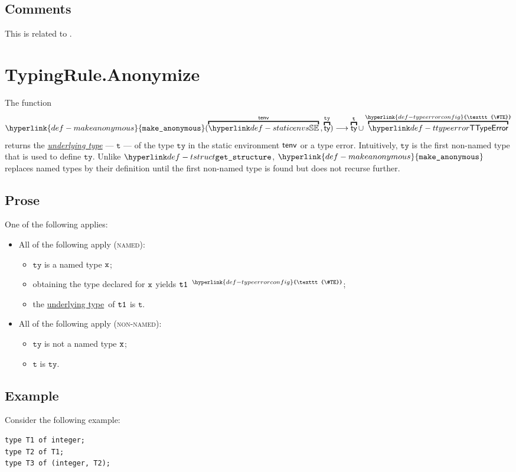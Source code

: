 \documentclass{book}
\newcommand\TypeErrorConfig[0]{\hyperlink{def-typeerrorconfig}{\texttt{\#TE}}}
\newcommand\ProseOrTypeError[0]{\hyperlink{def-proseortypeerror}{$^{\TypeErrorConfig}$}}
\newcommand\makeanonymous[0]{\hyperlink{def-makeanonymous}{\texttt{make\_anonymous}}}
\newcommand\underlyingtype[0]{\hyperlink{def-underlyingtype}{underlying type}}
\newcommand\vt[0]{\texttt{t}}
\newcommand\tty[0]{\texttt{ty}}
\begin{document}
\subsection{Comments}
This is related to .

\section{TypingRule.Anonymize \label{sec:anonymize}}
\hypertarget{def-makeanonymous}{}
\hypertarget{def-underlyingtype}{}
The function
\[
  \makeanonymous(\overname{\staticenvs}{\tenv} \aslsep \overname{\ty}{\tty}) \aslto \overname{\ty}{\vt} \cup \overname{\TTypeError}{\TypeErrorConfig}
\]
returns the \emph{\underlyingtype} --- $\vt$ --- of the type $\tty$ in the static environment $\textsf{tenv}$ or a type error.
Intuitively, $\tty$ is the first non-named type that is used to define $\tty$. Unlike $\tstruct$,
$\makeanonymous$ replaces named types by their definition until the first non-named type is found but
does not recurse further.

\subsection{Prose}
One of the following applies:
\begin{itemize}
  \item All of the following apply (\textsc{named}):
  \begin{itemize}
    \item $\tty$ is a named type $\texttt{x}$;
    \item obtaining the type declared for $\texttt{x}$ yields $\texttt{t1}$ \ProseOrTypeError;
    \item the \underlyingtype\ of $\texttt{t1}$ is $\vt$.
  \end{itemize}

  \item All of the following apply (\textsc{non-named}):
  \begin{itemize}
    \item $\tty$ is not a named type $\texttt{x}$;
    \item $\vt$ is $\tty$.
  \end{itemize}
\end{itemize}

\subsection{Example}
Consider the following example:
\begin{verbatim}
type T1 of integer;
type T2 of T1;
type T3 of (integer, T2);
\end{verbatim}
\end{document}
